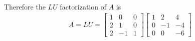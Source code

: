 \documentclass[11pt]{article}
\begin{document}
\begin{enumerate}
\begin{enumerate}
\begin{align*}
                \end{align*}
                Therefore the $LU$ factorization of $A$ is
                \begin{align*}
                    A = LU = 
                    \begin{bmatrix}
                        1 & 0 & 0 \\
                        2 & 1 & 0 \\
                        2 & -1 & 1
                    \end{bmatrix}
                    \begin{bmatrix}
                        1 & 2 & 4 \\
                        0 & -1 & -4 \\
                        0 & 0 & -6
                    \end{bmatrix}
                \end{align*}


\end{enumerate}
\end{enumerate}
\end{document}
